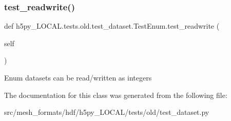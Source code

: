 \subsubsection{\texorpdfstring{test\+\_\+readwrite()}{test\_readwrite()}}
{\footnotesize\ttfamily def h5py\+\_\+\+L\+O\+C\+A\+L.\+tests.\+old.\+test\+\_\+dataset.\+Test\+Enum.\+test\+\_\+readwrite (\begin{DoxyParamCaption}\item[{}]{self }\end{DoxyParamCaption})}

\begin{DoxyVerb}Enum datasets can be read/written as integers \end{DoxyVerb}
 

The documentation for this class was generated from the following file\+:\begin{DoxyCompactItemize}
\item 
src/mesh\+\_\+formats/hdf/h5py\+\_\+\+L\+O\+C\+A\+L/tests/old/test\+\_\+dataset.\+py\end{DoxyCompactItemize}
